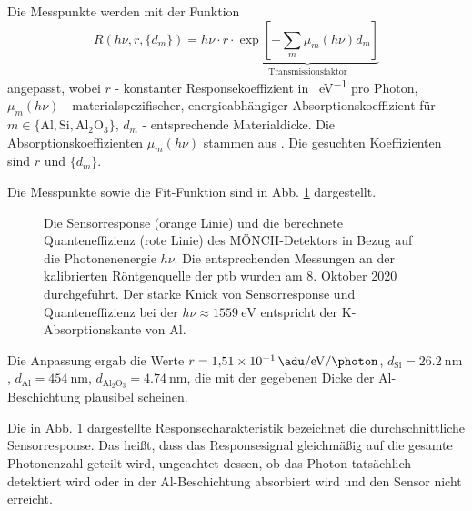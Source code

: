 \noindent
Die Messpunkte werden mit der Funktion
\begin{equation}
    R(h\nu, r, \{d_m\}) = h\nu\cdot r\cdot\underbrace{\exp\left[-\sum_{m}\mu_m(h\nu)d_m\right]}_{\text{Transmissionsfaktor}}
\label{eq:response_durchschnitt}
\end{equation}
angepasst, wobei $r$ - konstanter Responsekoeffizient in \si{\adu\per\eV} pro Photon, $\mu_m(h\nu)$ - materialspezifischer, energieabhängiger Absorptionskoeffizient für $m \in \{\text{Al}, \text{Si}, \text{Al$_2$O$_3$}\}$,  $d_m$ - entsprechende Materialdicke. Die Absorptionskoeffizienten $\mu_m(h\nu)$ stammen aus \cite{xray-coeffs}. Die gesuchten Koeffizienten sind $r$ und $\{d_m\}$.

\noindent
Die Messpunkte sowie die Fit-Funktion sind in Abb. \ref{fig:response_moench} dargestellt.
\begin{figure}[H]
    \centering
    
    \caption{Die Sensorresponse (orange Linie) und die berechnete Quanteneffizienz (rote Linie) des MÖNCH-Detektors in Bezug auf die Photonenenergie $h\nu$. Die entsprechenden Messungen an der kalibrierten Röntgenquelle der \gls{ptb} wurden am 8. Oktober 2020 durchgeführt. Der starke Knick von Sensorresponse und Quanteneffizienz bei der $h\nu \approx \SI{1559}{\eV}$ entspricht der K-Absorptionskante von Al.}
    \label{fig:response_moench}
\end{figure}
\noindent
Die Anpassung ergab die Werte
$r = \SI[per-mode = symbol]{1.51e-1}{\adu\per\eV\per\photon}$, $d_\text{Si} = \SI{26.2}{\nano\meter}$, $d_\text{Al} = \SI{454}{\nano\meter}$,
$d_\text{Al$_2$O$_3$} = \SI{4.74}{\nano\meter}$, die mit der gegebenen Dicke der Al-Beschichtung plausibel scheinen.

\noindent
Die in Abb. \ref{fig:response_moench} dargestellte Responsecharakteristik bezeichnet die durchschnittliche Sensorresponse. Das heißt, dass das Responsesignal gleichmäßig auf die gesamte Photonenzahl geteilt wird, ungeachtet dessen, ob das Photon tatsächlich detektiert wird oder in der Al-Beschichtung absorbiert wird und den Sensor nicht erreicht.

